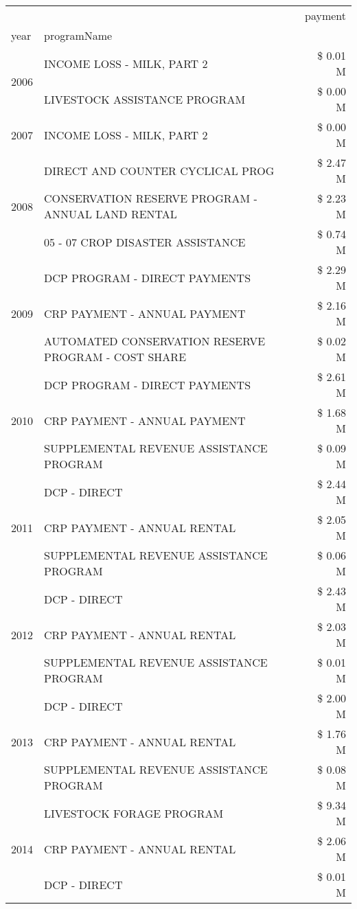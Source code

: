 \begin{tabular}{llr}
\toprule
 &  & payment \\
year & programName &  \\
\midrule
\multirow[t]{2}{*}{2006} & INCOME LOSS - MILK, PART 2 & \$ 0.01 M \\
 & LIVESTOCK ASSISTANCE PROGRAM & \$ 0.00 M \\
\cline{1-3}
2007 & INCOME LOSS - MILK, PART 2 & \$ 0.00 M \\
\cline{1-3}
\multirow[t]{3}{*}{2008} & DIRECT AND COUNTER CYCLICAL PROG & \$ 2.47 M \\
 & CONSERVATION RESERVE PROGRAM - ANNUAL LAND RENTAL & \$ 2.23 M \\
 & 05 - 07 CROP DISASTER ASSISTANCE & \$ 0.74 M \\
\cline{1-3}
\multirow[t]{3}{*}{2009} & DCP PROGRAM - DIRECT PAYMENTS & \$ 2.29 M \\
 & CRP PAYMENT - ANNUAL PAYMENT & \$ 2.16 M \\
 & AUTOMATED CONSERVATION RESERVE PROGRAM - COST SHARE & \$ 0.02 M \\
\cline{1-3}
\multirow[t]{3}{*}{2010} & DCP PROGRAM - DIRECT PAYMENTS & \$ 2.61 M \\
 & CRP PAYMENT - ANNUAL PAYMENT & \$ 1.68 M \\
 & SUPPLEMENTAL REVENUE ASSISTANCE PROGRAM & \$ 0.09 M \\
\cline{1-3}
\multirow[t]{3}{*}{2011} & DCP - DIRECT & \$ 2.44 M \\
 & CRP PAYMENT - ANNUAL RENTAL & \$ 2.05 M \\
 & SUPPLEMENTAL REVENUE ASSISTANCE PROGRAM & \$ 0.06 M \\
\cline{1-3}
\multirow[t]{3}{*}{2012} & DCP - DIRECT & \$ 2.43 M \\
 & CRP PAYMENT - ANNUAL RENTAL & \$ 2.03 M \\
 & SUPPLEMENTAL REVENUE ASSISTANCE PROGRAM & \$ 0.01 M \\
\cline{1-3}
\multirow[t]{3}{*}{2013} & DCP - DIRECT & \$ 2.00 M \\
 & CRP PAYMENT - ANNUAL RENTAL & \$ 1.76 M \\
 & SUPPLEMENTAL REVENUE ASSISTANCE PROGRAM & \$ 0.08 M \\
\cline{1-3}
\multirow[t]{3}{*}{2014} & LIVESTOCK FORAGE PROGRAM & \$ 9.34 M \\
 & CRP PAYMENT - ANNUAL RENTAL & \$ 2.06 M \\
 & DCP - DIRECT & \$ 0.01 M \\

\end{tabular}
